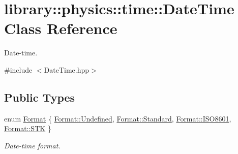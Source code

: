\hypertarget{classlibrary_1_1physics_1_1time_1_1_date_time}{}\section{library\+:\+:physics\+:\+:time\+:\+:Date\+Time Class Reference}
\label{classlibrary_1_1physics_1_1time_1_1_date_time}


Date-\/time.  




{\ttfamily \#include $<$Date\+Time.\+hpp$>$}

\subsection*{Public Types}
\begin{DoxyCompactItemize}
\item 
enum \hyperlink{classlibrary_1_1physics_1_1time_1_1_date_time_a99e6afd988c9b091b1540d707922c804}{Format} \{ \hyperlink{classlibrary_1_1physics_1_1time_1_1_date_time_a99e6afd988c9b091b1540d707922c804aec0fc0100c4fc1ce4eea230c3dc10360}{Format\+::\+Undefined}, 
\hyperlink{classlibrary_1_1physics_1_1time_1_1_date_time_a99e6afd988c9b091b1540d707922c804aeb6d8ae6f20283755b339c0dc273988b}{Format\+::\+Standard}, 
\hyperlink{classlibrary_1_1physics_1_1time_1_1_date_time_a99e6afd988c9b091b1540d707922c804a35b6786739efcdc5a74ab1dca29d3b6b}{Format\+::\+I\+S\+O8601}, 
\hyperlink{classlibrary_1_1physics_1_1time_1_1_date_time_a99e6afd988c9b091b1540d707922c804a9c3581080a26f47bbe0746a2d9b7cf2c}{Format\+::\+S\+TK}
 \}\begin{DoxyCompactList}\small\item\em Date-\/time format. \end{DoxyCompactList}
\end{DoxyCompactItemize}
